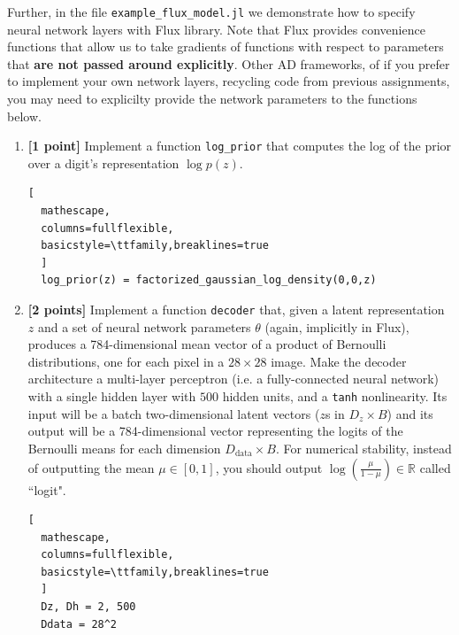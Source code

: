\documentclass{article}
\begin{document}
Further, in the file \texttt{example\_flux\_model.jl} we demonstrate how to specify neural network layers with Flux library.
Note that Flux provides convenience functions that allow us to take gradients of functions with respect to parameters that \textbf{are not passed around explicitly}.
Other AD frameworks, of if you prefer to implement your own network layers, recycling code from previous assignments, you may need to explicilty provide the network parameters to the functions below.

\begin{enumerate}[label=(\alph*)]
	
\item {\bf [1 point]} Implement a function \texttt{log\_prior} that computes the log of the prior over a digit's representation $\log p(z)$.

\begin{lstlisting}[
  mathescape,
  columns=fullflexible,
  basicstyle=\ttfamily,breaklines=true
  ]
  log_prior(z) = factorized_gaussian_log_density(0,0,z)
\end{lstlisting}

  \item {\bf [2 points]} Implement a function \texttt{decoder} that, given a latent representation $z$ and a set of neural network parameters $\theta$ (again, implicitly in Flux), produces a 784-dimensional mean vector of a product of Bernoulli distributions, one for each pixel in a $28 \times 28$ image.
	Make the decoder architecture a multi-layer perceptron (i.e. a fully-connected neural network) with a single hidden layer with $500$ hidden units, and a \texttt{tanh} nonlinearity.
  Its input will be a batch two-dimensional latent vectors ($z$s in $D_z \times B$) and its output will be a 784-dimensional vector representing the logits of the Bernoulli means for each dimension $D_\text{data}\times B$.
	For numerical stability, instead of outputting the mean $\mu \in [0,1]$, you should output $\log \left( \frac{\mu}{1 - \mu} \right) \in \mathbb{R}$ called ``logit".

\begin{lstlisting}[
  mathescape,
  columns=fullflexible,
  basicstyle=\ttfamily,breaklines=true
  ]
  Dz, Dh = 2, 500
  Ddata = 28^2
  

\end{lstlisting}
\end{enumerate}
\end{document}

